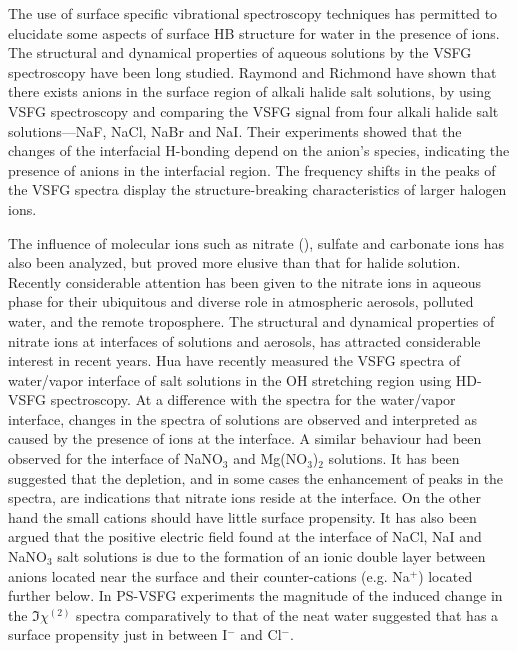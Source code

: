 The use of surface specific vibrational spectroscopy techniques has 
permitted to elucidate some aspects of surface HB structure for water in 
the presence of ions\cite{AJ12,AGL05}. 
The structural and dynamical properties of aqueous solutions by the VSFG spectroscopy have been long studied. 
Raymond and Richmond\cite{Raymond2004} have shown that there exists anions in the surface region of alkali halide salt solutions, 
by using VSFG spectroscopy and comparing the VSFG signal from four alkali halide salt solutions---NaF, NaCl, NaBr 
and NaI. Their experiments showed that the changes of the interfacial H-bonding depend on the anion's species, 
indicating the presence of anions in the interfacial region. The frequency shifts in the peaks of the VSFG spectra display 
the structure-breaking characteristics of larger halogen ions.

The influence of molecular ions such as nitrate (\nitrate), sulfate­ and 
carbonate ions­ has also been analyzed, but proved more elusive than that for halide solution\cite{SG05,PS03}.
Recently considerable attention has been given to the nitrate ions in aqueous phase 
for their ubiquitous and diverse role in atmospheric aerosols, polluted water, 
and the remote troposphere\cite{Pitts2000,XuM2009,Jubb2012,Cochran2017,Yadav2017}.
The structural and dynamical properties of 
nitrate ions at interfaces of solutions\cite{Banerjee2016,Yadav2017b} and aerosols\cite{Robinson2020}, has attracted considerable interest in recent years.
Hua \etal\cite{HuaWei2014} have recently measured the VSFG spectra of water/vapor interface of \LiN salt solutions in the OH stretching region
using HD-VSFG spectroscopy\cite{HuaWei2011,HuaWei2011b,ChenXiangKe2010}. 
At a difference with the spectra for the water/vapor interface, changes in the spectra of 
\LiN solutions are observed and interpreted as caused by the presence of ions at the interface.  
A similar behaviour had been observed for the interface of NaNO$_3$ and 
Mg(NO$_3$)$_2$ solutions\cite{AJ12,HuaWei2014}. 
It has been suggested that the depletion, and in some cases 
the enhancement of peaks in the spectra, are indications that nitrate 
ions reside at the interface. On the other hand the small 
cations should have little surface propensity. 
It has also been argued that the positive electric field found at the interface of NaCl, NaI and 
NaNO$_3$ salt solutions is due to the formation of an ionic double layer 
between anions located near the surface and their counter-cations (e.g.
Na$^+$) located further below. In PS-VSFG experiments the 
magnitude of the induced change in the $\Im\chi^{(2)}$ spectra comparatively
to that of the neat water suggested that \nitrate has a surface propensity 
just in between I$^-$ and Cl$^-$\cite{Verreault2013,Verreault2009}. 

